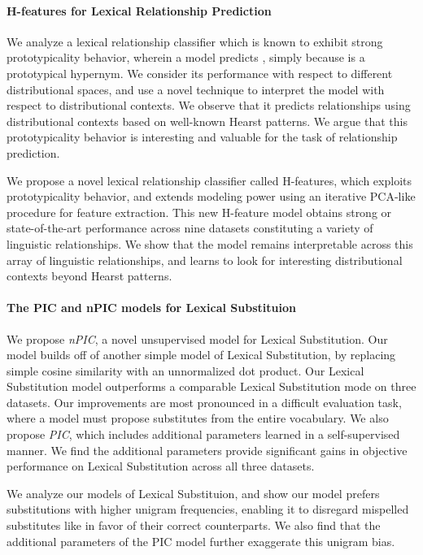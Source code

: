 \paragraph{H-features for Lexical Relationship Prediction}
We analyze a lexical relationship classifier which is known to exhibit
    strong prototypicality behavior, wherein a model predicts , simply because  is a prototypical
    hypernym. We consider its performance with respect to different
    distributional spaces, and use a novel technique to interpret the model
    with respect to distributional contexts. We observe that it predicts
    relationships using distributional contexts based on well-known Hearst
    patterns. We argue that this prototypicality behavior is interesting and
    valuable for the task of relationship prediction.

We propose a novel lexical relationship classifier called H-features,
    which exploits prototypicality behavior, and extends modeling power
    using an iterative PCA-like procedure for feature extraction. This new
    H-feature model obtains strong or state-of-the-art performance across
    nine datasets constituting a variety of linguistic relationships.
    We show that the model remains interpretable across this
    array of linguistic relationships, and learns to look for interesting
    distributional contexts beyond Hearst patterns.

\paragraph{The PIC and nPIC models for Lexical Substituion}
We propose {\em nPIC}, a novel unsupervised model for Lexical
    Substitution. Our model
    builds off of another simple model of Lexical Substitution, by replacing
    simple cosine similarity with an unnormalized dot product. Our Lexical
    Substitution model outperforms a comparable Lexical Substitution mode on
    three datasets. Our improvements are most pronounced in a difficult
    evaluation task, where a model must propose substitutes from the entire
    vocabulary.
    We also propose {\em PIC}, which includes additional parameters
    learned in a self-supervised manner. We find the additional parameters
    provide significant gains in objective performance on Lexical Substitution
    across all three datasets.

    We analyze our models of Lexical Substituion, and show our model
    prefers substitutions  with higher unigram frequencies, enabling it to
    disregard mispelled substitutes like  in favor of
    their correct counterparts. We also find that the additional parameters
    of the PIC model further exaggerate this unigram bias.

